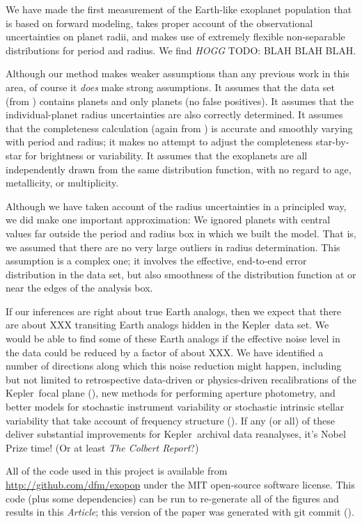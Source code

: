 \documentclass[12pt,preprint]{aastex}
\newcommand{\project}[1]{{\sffamily #1}}
\newcommand{\kepler}{\project{Kepler}}
\newcommand{\paper}{\emph{Article}}
\newcommand{\todo}[3]{{\color{#2} \emph{#1} TODO: #3}}
\newcommand{\hoggtodo}[1]{\todo{HOGG}{blue}{#1}}
\begin{document}
We have made the first measurement of the Earth-like exoplanet population that
is based on forward modeling, takes proper account of the observational
uncertainties on planet radii, and makes use of extremely flexible
non-separable distributions for period and radius.
We find \hoggtodo{BLAH BLAH BLAH.}

Although our method makes weaker assumptions than any previous work in this
area, of course it \emph{does} make strong assumptions.
It assumes that the data set (from \citealt{petigura}) contains planets and
only planets (no false positives).
It assumes that the individual-planet radius uncertainties are also correctly
determined.
It assumes that the completeness calculation (again from \citealt{petigura})
is accurate and smoothly varying with period and radius; it makes no attempt
to adjust the completeness star-by-star for brightness or variability.
It assumes that the exoplanets are all independently drawn from the same
distribution function, with no regard to age, metallicity, or multiplicity.

Although we have taken account of the radius uncertainties in a principled
way, we did make one important approximation: We ignored planets with central
values far outside the period and radius box in which we built the model.
That is, we assumed that there are no very large outliers in radius
determination.
This assumption is a complex one; it involves the effective, end-to-end error
distribution in the data set, but also smoothness of the distribution function
at or near the edges of the analysis box.

If our inferences are right about true Earth analogs, then we expect that
there are about XXX transiting Earth analogs hidden in the \kepler\ data set.
We would be able to find some of these Earth analogs if the effective noise
level in the data could be reduced by a factor of about XXX.
We have identified a number of directions along which this noise reduction
might happen, including but not limited to retrospective data-driven or
physics-driven recalibrations of the \kepler\ focal plane
(\citealt{hoggwhitepaper}), new methods for performing aperture photometry,
and better models for stochastic instrument variability or stochastic
intrinsic stellar variability that take account of frequency structure
(\citealt{brewer, carter, roberts}).
If any (or all) of these deliver substantial improvements for \kepler\
archival data reanalyses, it's Nobel Prize time!  (Or at least \textsl{The
Colbert Report}?)

All of the code used in this project is available from
\url{http://github.com/dfm/exopop} under the MIT open-source software license.
This code (plus some dependencies) can be run to re-generate all of the
figures and results in this \paper; this version of the paper was generated
with git commit \texttt{\githash} (\gitdate).
\end{document}
